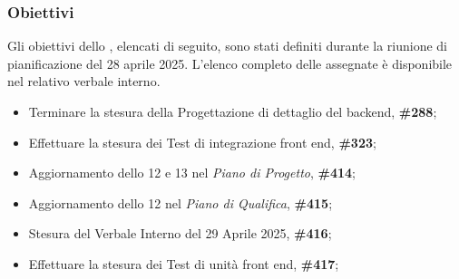 \subsubsection{Obiettivi}
\label{sec:obiettivi_sprint13}

Gli obiettivi dello , elencati di seguito, sono stati definiti durante la riunione di pianificazione del 28 aprile 2025.
L’elenco completo delle  assegnate è disponibile nel relativo verbale interno.

\begin{itemize}
    \item Terminare la stesura della Progettazione di dettaglio del backend,  \textbf{\#288};
    \item Effettuare la stesura dei Test di integrazione front end,  \textbf{\#323};
    \item Aggiornamento dello  12 e 13 nel \textit{Piano di Progetto},  \textbf{\#414};
    \item Aggiornamento dello  12 nel \textit{Piano di Qualifica},  \textbf{\#415};
    \item Stesura del Verbale Interno del 29 Aprile 2025,  \textbf{\#416};
    \item Effettuare la stesura dei Test di unità front end,  \textbf{\#417};
\end{itemize}
